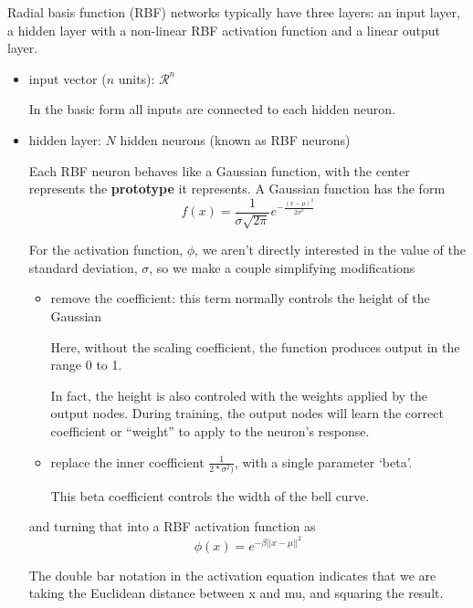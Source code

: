 Radial basis function (RBF) networks typically have three layers: an input
layer, a hidden layer with a non-linear RBF activation function and a linear
output layer.
\begin{itemize}
  \item input vector ($n$ units): $\mathcal{R}^n$
  
  In the basic form all inputs are connected to each hidden neuron.

  \item hidden layer: $N$ hidden neurons (known as RBF neurons)
  
  Each RBF neuron behaves like a Gaussian function, with the center represents
  the {\bf prototype} it represents. A Gaussian function has the form
  \begin{equation}
  f(x) = \frac{1}{\sigma \sqrt{2\pi}} e^{-\frac{(x-\mu)^2}{2\sigma^2}}
  \end{equation}
  
  For the activation function, $\phi$, we aren’t directly interested in the
  value of the standard deviation, $\sigma$, so we make a couple simplifying
  modifications 
  \begin{itemize}
    \item remove the coefficient: this term normally controls the height of the Gaussian

  Here, without the scaling coefficient, the function produces output in the range 0 to 1.
      
   In fact, the height is also controled with the weights applied by the output
   nodes.
   During training, the output nodes will learn the correct coefficient or
   “weight” to apply to the neuron’s response.
     
    \item replace the inner coefficient  $\frac{1}{2 * \sigma^2)}$, with a
    single parameter ‘beta’.
    
    This beta coefficient controls the width of the bell curve.
  \end{itemize}
  
  and turning that into a RBF activation function as
  \begin{equation}
  \phi(x) = e^{-\beta || x - \mu||^2}
  \end{equation}
  
  The double bar notation in the activation equation indicates that we are
  taking the Euclidean distance between x and mu, and squaring the result.
 
\begin{mdframed}


\end{mdframed}
\end{itemize}
